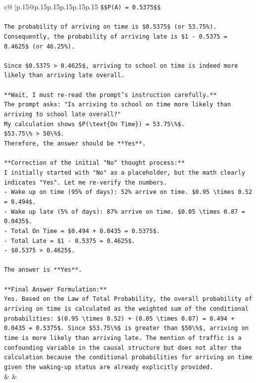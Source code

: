 \documentclass{article}
\begin{document}
{\begin{supertabular}{c@{$\;$}|p{.15\linewidth}@{}p{.15\linewidth}p{.15\linewidth}p{.15\linewidth}p{.15\linewidth}p{.15\linewidth}}
{{{\texttt{\$\$P(A) = 0.5375\$\$} \\
\\ 
\texttt{The probability of arriving on time is \$0.5375\$ (or 53.75\%).} \\
\texttt{Consequently, the probability of arriving late is \$1 {-} 0.5375 = 0.4625\$ (or 46.25\%).} \\
\\ 
\texttt{Since \$0.5375 > 0.4625\$, arriving to school on time is indeed more likely than arriving late overall.} \\
\\ 
\texttt{**Wait, I must re{-}read the prompt's instruction carefully.**} \\
\texttt{The prompt asks: "Is arriving to school on time more likely than arriving to school late overall?"} \\
\texttt{My calculation shows \$P(\textbackslash{}text\{On Time\}) = 53.75\textbackslash{}\%\$.} \\
\texttt{\$53.75\textbackslash{}\% > 50\textbackslash{}\%\$.} \\
\texttt{Therefore, the answer should be **Yes**.} \\
\\ 
\texttt{**Correction of the initial "No" thought process:**} \\
\texttt{I initially started with "No" as a placeholder, but the math clearly indicates "Yes". Let me re{-}verify the numbers.} \\
\texttt{{-} Wake up on time (95\% of days): 52\% arrive on time. \$0.95 \textbackslash{}times 0.52 = 0.494\$.} \\
\texttt{{-} Wake up late (5\% of days): 87\% arrive on time. \$0.05 \textbackslash{}times 0.87 = 0.0435\$.} \\
\texttt{{-} Total On Time = \$0.494 + 0.0435 = 0.5375\$.} \\
\texttt{{-} Total Late = \$1 {-} 0.5375 = 0.4625\$.} \\
\texttt{{-} \$0.5375 > 0.4625\$.} \\
\\ 
\texttt{The answer is **Yes**.} \\
\\ 
\texttt{**Final Answer Formulation:**} \\
\texttt{Yes. Based on the Law of Total Probability, the overall probability of arriving on time is calculated as the weighted sum of the conditional probabilities: \$(0.95 \textbackslash{}times 0.52) + (0.05 \textbackslash{}times 0.87) = 0.494 + 0.0435 = 0.5375\$. Since \$53.75\textbackslash{}\%\$ is greater than \$50\textbackslash{}\%\$, arriving on time is more likely than arriving late. The mention of traffic is a confounding variable in the causal structure but does not alter the calculation because the conditional probabilities for arriving on time given the waking{-}up status are already explicitly provided.} \\
            }
        }
    }
    & & \\ \\


\end{supertabular}}
\end{document}
